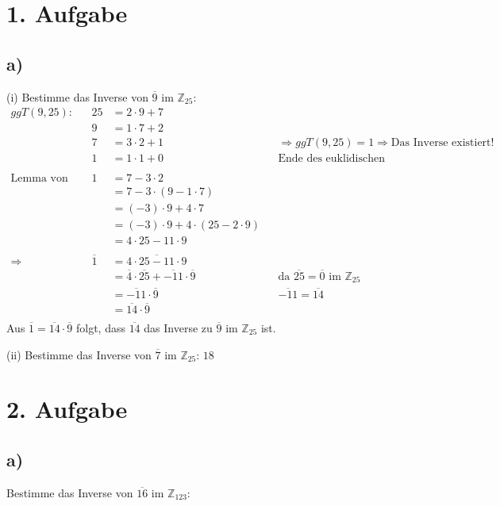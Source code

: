 \documentclass[]{article}
\newcommand{\T}[1]{\overline{#1}}
\newcommand{\rarr}{\Rightarrow}
\begin{document}
\section*{1. Aufgabe}
\subsection*{a)}
(i) Bestimme das Inverse von $\T{9}$ im $\mathbb{Z}_{25}$:
\begin{align*}
	ggT(9,25):&& 25&= 2 \cdot 9 + 7&&\\
	&& 9&= 1 \cdot 7 + 2&&\\
	&& 7&= 3 \cdot 2 + 1&&\rarr ggT(9,25) = 1 \rarr \text{Das Inverse existiert!}\\
	&& 1&= 1 \cdot 1 + 0&&\text{Ende des euklidischen Algorithmus}\\
	\\
	\text{Lemma von Bézout:} && 1&= 7 - 3 \cdot 2 &&\\
	&& &= 7 - 3 \cdot (9-1\cdot 7) &&\\
	&& &= (-3) \cdot 9 + 4 \cdot 7&&\\
	&& &= (-3) \cdot 9 + 4 \cdot (25-2\cdot 9)&&\\
	&& &= 4 \cdot 25 - 11 \cdot 9&&\\
	\\
	\rarr&& \T{1}&= \T{4 \cdot 25 - 11 \cdot 9}&&\\
	&& &= \T{4} \cdot \T{25} + \T{- 11} \cdot \T{9}&&\text{da $\T{25} = \T{0}$ im $\mathbb{Z}_{25}$}\\
	&& &= \T{- 11} \cdot \T{9}&& \T{-11} = \T{14}\\
	&& &= \T{14} \cdot \T{9}&&\\
\end{align*}
Aus $\T{1} = \T{14} \cdot \T{9}$ folgt, dass $\T{14}$ das Inverse zu $\T{9}$ im $\mathbb{Z}_{25}$ ist.

(ii) Bestimme das Inverse von $\T{7}$ im $\mathbb{Z}_{25}$: $18$

\newpage
\section*{2. Aufgabe}
\subsection*{a)}
Bestimme das Inverse von $\T{16}$ im $\mathbb{Z}_{123}$:
\end{document}
